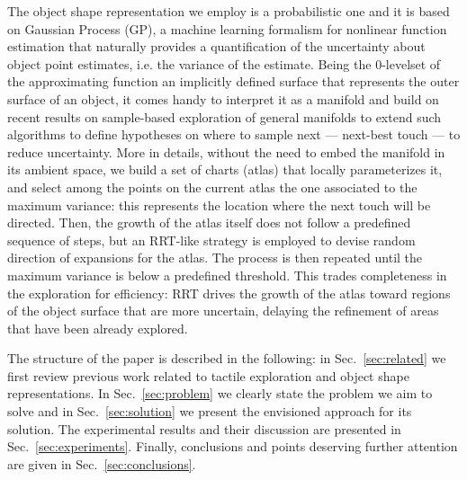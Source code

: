 The object shape representation we employ is a probabilistic one and it is based on Gaussian Process (GP), a machine learning formalism for nonlinear function estimation that naturally provides a quantification of the uncertainty about object point estimates, i.e. the variance of the estimate. Being the $0$-levelset of the approximating function an implicitly defined surface that represents the outer surface of an object, it comes handy to interpret it as a manifold and build on recent results on sample-based exploration of general manifolds to extend such algorithms to define hypotheses on where to sample next --- next-best touch --- to reduce uncertainty. More in details, without the need to embed the manifold in its ambient space, we build a set of charts (atlas) that locally parameterizes it, and select among the points on the current atlas the one associated to the maximum variance: this represents the location where the next touch will be directed. Then, the growth of the atlas itself does not follow a predefined sequence of steps, but an RRT-like strategy is employed to devise random direction of expansions for the atlas. The process is then repeated until the maximum variance is below a predefined threshold. This trades completeness in the exploration for efficiency: RRT drives the growth of the atlas toward  regions of the object surface that are more uncertain, delaying the refinement of areas that have been already explored.

The structure of the paper is described in the following: in Sec.~\ref{sec:related} we first review previous work related to tactile exploration and object shape representations. In Sec.~\ref{sec:problem} we clearly state the problem we aim to solve and in Sec.~\ref{sec:solution} we present the envisioned approach for its solution. The experimental results and their discussion are presented in Sec.~\ref{sec:experiments}. Finally, conclusions and points deserving further attention are given in Sec.~\ref{sec:conclusions}.










